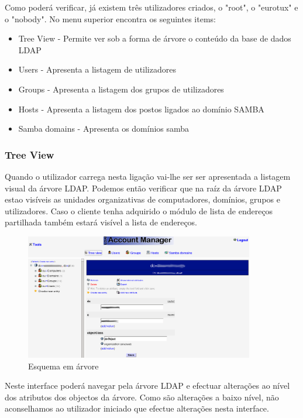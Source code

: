 Como poderá verificar, já existem três utilizadores criados, o "root", o "eurotux" e o "nobody". No menu superior encontra os seguintes items:

\begin{itemize}
\item Tree View - Permite ver sob a forma de árvore o conteúdo da base de dados LDAP
\item Users - Apresenta a listagem de utilizadores
\item Groups - Apresenta a listagem dos grupos de utilizadores
\item Hosts - Apresenta a listagem dos postos ligados ao domínio SAMBA
\item Samba domains - Apresenta os domínios samba
\end{itemize}

\subsubsection{Tree View}
Quando o utilizador carrega nesta ligação vai-lhe ser ser apresentada a listagem visual da árvore LDAP. Podemos então verificar que na raíz da árvore LDAP estao visíveis as unidades organizativas de computadores, domínios, grupos e utilizadores. Caso o cliente tenha adquirido o módulo de lista de endereços partilhada também estará visível a lista de endereços.

\begin{figure}[H]
    \begin{center}
        \includegraphics[width=10cm]{include/img/lam3}
    \end{center}
    \caption{Esquema em árvore}
    \label{fig:LAM3}
\end{figure}

Neste interface poderá navegar pela árvore LDAP e efectuar alterações ao nível dos atributos dos objectos da árvore. Como são alterações a baixo nível, não aconselhamos ao utilizador iniciado que efectue alterações nesta interface.


